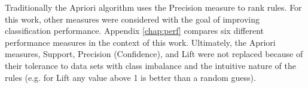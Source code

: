 



Traditionally the Apriori algorithm uses the Precision measure to rank rules. For this work, other measures were considered with the goal of improving classification performance. Appendix \ref{chap:perf} compares six different performance measures in the context of this work. Ultimately, the Apriori measures, Support, Precision (Confidence), and Lift were not replaced because of their tolerance to data sets with class imbalance and the intuitive nature of the rules (e.g. for Lift any value above 1 is better than a random guess).





